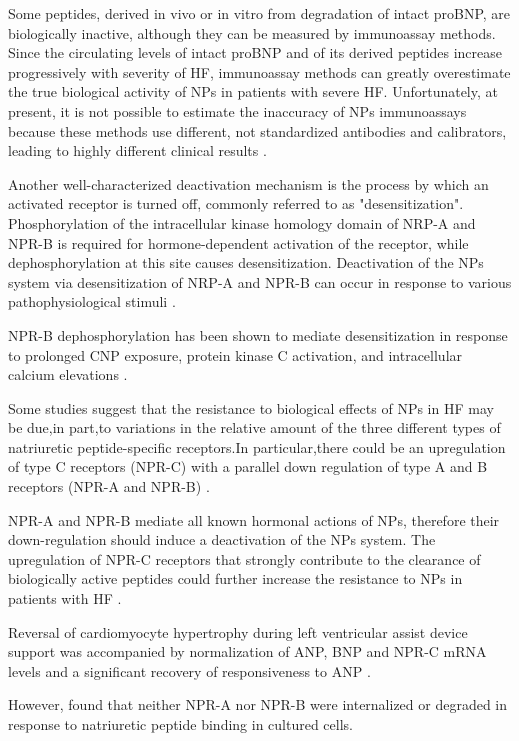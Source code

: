 \documentclass[14pt,a4paper,onecolumn]{extarticle}
\begin{document}
Some peptides, derived in vivo or in vitro from degradation of intact proBNP, are biologically inactive, although they can be measured by immunoassay methods. Since the circulating levels of intact proBNP and of its derived peptides increase progressively with severity of HF, immunoassay methods can greatly overestimate the true biological activity of NPs in patients with severe HF. Unfortunately, at present, it is not possible to estimate the inaccuracy of NPs immunoassays because these methods use different, not standardized antibodies and calibrators, leading to highly different clinical results \citep{bib36}. %

Another well-characterized deactivation mechanism is the process by which an activated receptor is turned off, commonly referred to as "desensitization". Phosphorylation of the intracellular kinase homology domain of NRP-A and NPR-B is required for hormone-dependent activation of the receptor, while dephosphorylation at this site causes desensitization. Deactivation of the NPs system via desensitization of NRP-A and NPR-B can occur in response to various pathophysiological stimuli \citep{bib348}.%

NPR-B dephosphorylation has been shown to mediate desensitization in response to prolonged CNP exposure, protein kinase C activation, and intracellular calcium elevations \citep{Potter2000} \citep{Potthast2004}.

Some studies suggest that the resistance to biological effects of NPs in HF may be due,in part,to variations in the relative amount of the three different types of natriuretic peptide-specific receptors.In particular,there could be an upregulation of type C receptors (NPR-C) with a parallel down regulation of type A and B receptors (NPR-A and NPR-B) \citep{bib343} \citep{bib347}. %

NPR-A and NPR-B mediate all known hormonal actions of NPs, therefore their down-regulation should induce a deactivation of the NPs system. The upregulation of NPR-C receptors that strongly contribute to the clearance of biologically active peptides could further increase the resistance to NPs in patients with HF \citep{bib343}. %

Reversal of cardiomyocyte hypertrophy during left ventricular assist device support was accompanied by normalization of ANP, BNP and NPR-C mRNA levels and a significant recovery of responsiveness to ANP \citep{bib347}. %

However,  \citep{bib348} found that neither NPR-A nor NPR-B were internalized or degraded in response to natriuretic peptide binding in cultured cells. %
\end{document}
